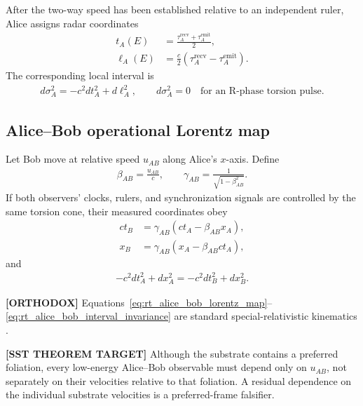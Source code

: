 After the two-way speed has been established relative to an independent ruler,
Alice assigns radar coordinates
\begin{align}
    t_A(E)
    &=
    \frac{\tau_A^{\mathrm{recv}}+\tau_A^{\mathrm{emit}}}{2},\\
    \ell_A(E)
    &=
    \frac{c}{2}
    \left(
        \tau_A^{\mathrm{recv}}-\tau_A^{\mathrm{emit}}
    \right).
    \label{eq:rt_vortex_atom_radar_coordinates}
\end{align}
The corresponding local interval is
\begin{align}
    d\sigma_A^2
    =
    -c^2dt_A^2+d\ell_A^2,
    \qquad
    d\sigma_A^2=0
    \quad\text{for an R-phase torsion pulse}.
    \label{eq:rt_vortex_atom_operational_interval}
\end{align}

\subsection{Alice--Bob operational Lorentz map}

Let Bob move at relative speed \(u_{AB}\) along Alice's \(x\)-axis. Define
\begin{align}
    \beta_{AB}=\frac{u_{AB}}{c},
    \qquad
    \gamma_{AB}=\frac{1}{\sqrt{1-\beta_{AB}^2}}.
\end{align}
If both observers' clocks, rulers, and synchronization signals are controlled by
the same torsion cone, their measured coordinates obey
\begin{align}
    ct_B
    &=
    \gamma_{AB}
    \left(ct_A-\beta_{AB}x_A\right),\\
    x_B
    &=
    \gamma_{AB}
    \left(x_A-\beta_{AB}ct_A\right),
    \label{eq:rt_alice_bob_lorentz_map}
\end{align}
and
\begin{align}
    -c^2dt_A^2+dx_A^2
    =
    -c^2dt_B^2+dx_B^2 .
    \label{eq:rt_alice_bob_interval_invariance}
\end{align}

\textbf{[ORTHODOX]} Equations~\eqref{eq:rt_alice_bob_lorentz_map}--
\eqref{eq:rt_alice_bob_interval_invariance} are standard special-relativistic
kinematics \cite{Einstein1905}.

\textbf{[SST THEOREM TARGET]} Although the substrate contains a preferred
foliation, every low-energy Alice--Bob observable must depend only on
\(u_{AB}\), not separately on their velocities relative to that foliation. A
residual dependence on the individual substrate velocities is a preferred-frame
falsifier.

